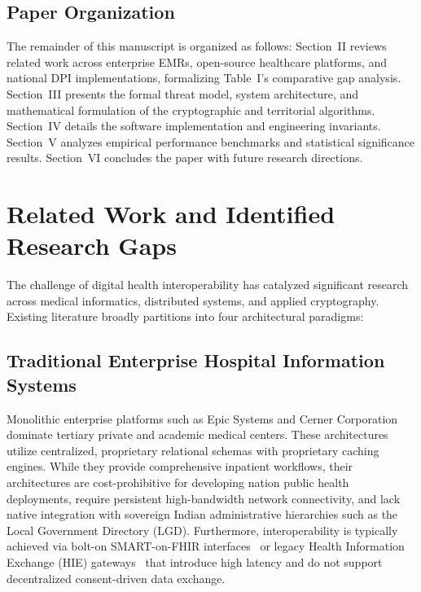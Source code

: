 \documentclass[journal,twocolumn]{IEEEtran}
\begin{document}
\subsection{Paper Organization}
The remainder of this manuscript is organized as follows: Section~II reviews related work across enterprise EMRs, open-source healthcare platforms, and national DPI implementations, formalizing Table~I's comparative gap analysis. Section~III presents the formal threat model, system architecture, and mathematical formulation of the cryptographic and territorial algorithms. Section~IV details the software implementation and engineering invariants. Section~V analyzes empirical performance benchmarks and statistical significance results. Section~VI concludes the paper with future research directions.

\section{Related Work and Identified Research Gaps}
The challenge of digital health interoperability has catalyzed significant research across medical informatics, distributed systems, and applied cryptography. Existing literature broadly partitions into four architectural paradigms:

\subsection{Traditional Enterprise Hospital Information Systems}
Monolithic enterprise platforms such as Epic Systems and Cerner Corporation dominate tertiary private and academic medical centers. These architectures utilize centralized, proprietary relational schemas with proprietary caching engines. While they provide comprehensive inpatient workflows, their architectures are cost-prohibitive for developing nation public health deployments, require persistent high-bandwidth network connectivity, and lack native integration with sovereign Indian administrative hierarchies such as the Local Government Directory (LGD). Furthermore, interoperability is typically achieved via bolt-on SMART-on-FHIR interfaces~\cite{mandel_smart_fhir} or legacy Health Information Exchange (HIE) gateways~\cite{gunter_hie_2014} that introduce high latency and do not support decentralized consent-driven data exchange.
\end{document}
